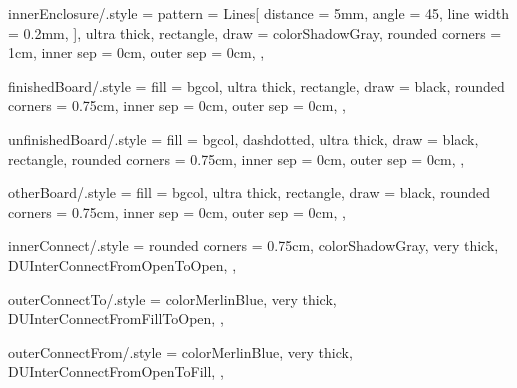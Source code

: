 {    innerEnclosure/.style = {
        pattern = {Lines[
            distance = 5mm,
            angle = 45,
            line width = 0.2mm,
        ]},
        ultra thick,
        rectangle,
        draw = colorShadowGray,
        rounded corners = 1cm,
        inner sep = 0cm,
        outer sep = 0cm,
    },

    finishedBoard/.style = {
        fill = bgcol,
        ultra thick,
        rectangle,
        draw = black,
        rounded corners = 0.75cm,
        inner sep = 0cm,
        outer sep = 0cm,
    },

    unfinishedBoard/.style = {
        fill = bgcol,
        dashdotted,
        ultra thick,
        draw = black,
        rectangle,
        rounded corners = 0.75cm,
        inner sep = 0cm,
        outer sep = 0cm,
    },

    otherBoard/.style = {
        fill = bgcol,
        ultra thick,
        rectangle,
        draw = black,
        rounded corners = 0.75cm,
        inner sep = 0cm,
        outer sep = 0cm,
    },


    innerConnect/.style = {
        rounded corners = 0.75cm,
        colorShadowGray,
        very thick,
        DUInterConnectFromOpenToOpen,
    },

    outerConnectTo/.style = {
        colorMerlinBlue,
        very thick,
        DUInterConnectFromFillToOpen,
    },

    outerConnectFrom/.style = {
        colorMerlinBlue,
        very thick,
        DUInterConnectFromOpenToFill,
    },

}

\newcommand\innerEnclosureNode[3] {
    \draw
    let \p{TEMPDIMA} = ($(#2)-(#3)$),
    \n{TEMPDIMX} = {veclen(\x{TEMPDIMA}, 0)},
    \n{TEMPDIMY} = {veclen(0, \y{TEMPDIMA})}
    in
    ($(#2)!0.50!(#3)$)
    node (#1) [
        innerEnclosure,
        minimum height = \n{TEMPDIMY},
        minimum width = \n{TEMPDIMX},
        anchor = center,
    ] {}
    ;
}

\newcommand\finishedBoardNode[4] {
    \draw
    let \p{TEMPDIMA} = ($(#2)-(#3)$),
    \n{TEMPDIMX} = {veclen(\x{TEMPDIMA}, 0)},
    \n{TEMPDIMY} = {veclen(0, \y{TEMPDIMA})}
    in
    ($(#2)!0.50!(#3)$)
    node (#1) [
        finishedBoard,
        minimum height = \n{TEMPDIMY},
        minimum width = \n{TEMPDIMX},
        anchor = center,
    ] {\LARGE #4}
    ;
}

